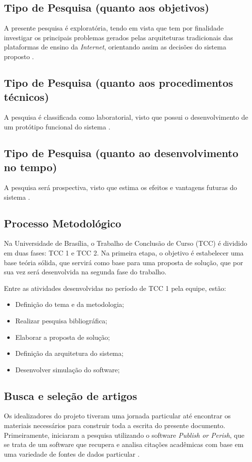 \subsection{Tipo de Pesquisa (quanto aos objetivos)}
A presente pesquisa é exploratória, tendo em vista que tem por finalidade investigar os principais problemas gerados pelas arquiteturas tradicionais das plataformas de ensino da \textit{Internet}, orientando assim as decisões do sistema proposto \cite{fontelles2009}.

\subsection{Tipo de Pesquisa (quanto aos procedimentos técnicos)}
A pesquisa é classificada como laboratorial, visto que possui o desenvolvimento de um protótipo funcional do sistema \cite{fontelles2009}.

\subsection{Tipo de Pesquisa (quanto ao desenvolvimento no tempo)}
A pesquisa será prospectiva, visto que estima os efeitos e vantagens futuras do sistema \cite{fontelles2009}.

\subsection{Processo Metodológico}
Na Universidade de Brasília, o Trabalho de Conclusão de Curso (TCC) é dividido em duas fases: TCC 1 e TCC 2. Na primeira etapa, o objetivo é estabelecer uma base teória sólida, que servirá como base para uma proposta de solução, que por sua vez será desenvolvida na segunda fase do trabalho.

Entre as atividades desenvolvidas no período de TCC 1 pela equipe, estão:
\begin{itemize}
    \item Definição do tema e da metodologia;
    \item Realizar pesquisa bibliográfica;
    \item Elaborar a proposta de solução;
    \item Definição da arquitetura do sistema;
    \item Desenvolver simulação do software;
\end{itemize}

\subsection{Busca e seleção de artigos}
Os idealizadores do projeto tiveram uma jornada particular até encontrar os materiais necessários para construir toda a escrita do presente documento. Primeiramente, iniciaram a pesquisa utilizando o software \textit{Publish or Perish}, que se trata de um software que recupera e analisa citações acadêmicas com base em uma variedade de fontes de dados particular \cite{harzing2025publish}.

